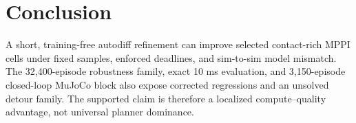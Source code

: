 \documentclass[conference]{IEEEtran}
\begin{document}
\section{Conclusion}

A short, training-free autodiff refinement can improve selected contact-rich
MPPI cells under fixed samples, enforced deadlines, and sim-to-sim model
mismatch.  The 32,400-episode robustness family, exact 10 ms evaluation, and
3,150-episode closed-loop MuJoCo block also expose corrected regressions and
an unsolved detour family.  The supported claim is therefore a localized
compute--quality advantage, not universal planner dominance.



\end{document}
